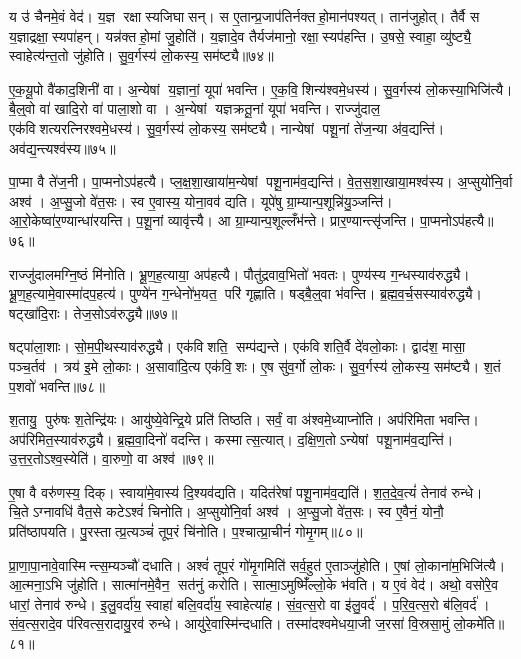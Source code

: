 य उ॑ चैनमे॒वं वेद॑।
य॒ज्ञ रक्षास्यजिघासन्।
स ए॒तान्प्र॒जाप॑तिर्नक्तहो॒मान॑पश्यत्।
तान॑जुहोत्।
तैर्वै स य॒ज्ञाद्रक्षा॒स्यपा॑हन्।
यन्न॑क्तहो॒मां जु॒होति॑।
य॒ज्ञादे॒व तैर्यज॑मानो॒ रक्षा॒स्यप॑हन्ति।
उ॒षसे॒ स्वाहा॒ व्यु॑ष्ट्यै॒ स्वाहेत्य॑न्त॒तो जु॑होति।
सु॒व॒र्गस्य॑ लो॒कस्य॒ सम॑ष्ट्यै॥७४॥\anuvakamend[वै नभासि॒ सूर्यो॒ ज्योति॒ सन्त॑त्यै॒ सम॑ष्ट्यै भू॒तं यज॑ते॒ नव॑ च]

ए॒क॒यू॒पो वै॑काद॒शिनी॑ वा।
अ॒न्येषां य॒ज्ञानां॒ यूपा॑ भवन्ति।
ए॒क॒वि॒शिन्य॑श्वमे॒धस्य॑।
सु॒व॒र्गस्य॑ लो॒कस्या॒भिजि॑त्यै।
बै॒ल्॒वो वा॑ खादि॒रो वा॑ पाला॒शो वा।
अ॒न्येषां यज्ञक्रतू॒नां यूपा॑ भवन्ति।
राज्जु॑दाल॒ एक॑विशत्यरत्निरश्वमे॒धस्य॑।
सु॒व॒र्गस्य॑ लो॒कस्य॒ सम॑ष्ट्यै।
नान्येषां पशू॒नां ते॑ज॒न्या अ॑व॒द्यन्ति॑।
अव॑द्य॒न्त्यश्व॑स्य॥७५॥

पा॒प्मा वै ते॑ज॒नी।
पा॒प्मनोऽप॑हत्यै।
प्ल॒क्ष॒शा॒खाया॑म॒न्येषां पशू॒नाम॑व॒द्यन्ति॑।
वे॒त॒स॒शा॒खाया॒मश्व॑स्य।
अ॒प्सुयो॑नि॒र्वा अश्व॑।
अ॒प्सु॒जो वे॑त॒सः।
स्व ए॒वास्य॒ योना॒वव॑ द्यति।
यूपे॑षु ग्रा॒म्यान्प॒शून्नि॑यु॒ञ्जन्ति॑।
आ॒रो॒केष्वा॑र॒ण्यान्धा॑रयन्ति।
प॒शू॒नां व्यावृ॑त्त्यै।
आ ग्रा॒म्यान्प॒शूल्लँभ॑न्ते।
प्रार॒ण्यान्त्सृ॑जन्ति।
पा॒प्मनोऽप॑हत्यै॥७६॥\anuvakamend[अश्व॑स्य॒ व्यावृ॑त्त्यै॒ त्रीणि॑ च]

राज्जु॑दालमग्नि॒ष्ठं मि॑नोति।
भ्रू॒ण॒ह॒त्याया॒ अप॑हत्यै।
पौतु॑द्रवाव॒भितो॑ भवतः।
पुण्य॑स्य ग॒न्धस्याव॑रुद्ध्यै।
भ्रू॒ण॒ह॒त्यामे॒वास्मा॑दप॒हत्य॑।
पुण्ये॑न ग॒न्धेनो॑भ॒यत॒ परि॑ गृह्णाति।
षड्बै॒ल्॒वा भ॑वन्ति।
ब्र॒ह्म॒व॒र्च॒सस्याव॑रुद्ध्यै।
षट्खा॑दि॒राः।
तेज॒सोऽव॑रुद्ध्यै॥७७॥

षट्पा॑ला॒शाः।
सो॒म॒पी॒थस्याव॑रुद्ध्यै।
एक॑विशति॒ सम्प॑द्यन्ते।
एक॑विशति॒र्वै दे॑वलो॒काः।
द्वाद॑श॒ मासा॒ पञ्च॒र्तव॑।
त्रय॑ इ॒मे लो॒काः।
अ॒सावा॑दि॒त्य एक॑वि॒शः।
ए॒ष सु॑व॒र्गो लो॒कः।
सु॒व॒र्गस्य॑ लो॒कस्य॒ सम॑ष्ट्यै।
श॒तं प॒शवो॑ भवन्ति॥७८॥

श॒तायु॒ पुरु॑षः श॒तेन्द्रि॑यः।
आयु॑ष्ये॒वेन्द्रि॒ये प्रति॑ तिष्ठति।
सर्वं॒ वा अ॑श्वमे॒ध्याप्नो॑ति।
अप॑रिमिता भवन्ति।
अप॑रिमित॒स्याव॑रुद्ध्यै।
ब्र॒ह्म॒वा॒दिनो॑ वदन्ति।
कस्मात्स॒त्यात्।
द॒क्षि॒ण॒तोऽन्येषां पशू॒नाम॑व॒द्यन्ति॑।
उ॒त्त॒र॒तोऽश्व॒स्येति॑।
वा॒रुणो॒ वा अश्व॑॥७९॥

ए॒षा वै वरु॑णस्य॒ दिक्।
स्वाया॑मे॒वास्य॑ दि॒श्यव॑द्यति।
यदित॑रेषां पशू॒नाम॑व॒द्यति॑।
श॒त॒दे॒व॒त्यं॑ तेनाव॑ रुन्धे।
चि॒तेऽग्नावधि॑ वैत॒से कटेऽश्वं॑ चिनोति।
अ॒प्सुयो॑नि॒र्वा अश्व॑।
अ॒प्सु॒जो वे॑त॒सः।
स्व ए॒वैनं॒ योनौ॒ प्रति॑ष्ठापयति।
पु॒रस्तात्प्र॒त्यञ्चं॑ तूप॒रं चि॑नोति।
प॒श्चात्प्रा॒चीनं॑ गोमृ॒गम्॥८०॥

प्रा॒णा॒पा॒नावे॒वास्मिन्त्स॒म्यञ्चौ॑ दधाति।
अश्वं॑ तूप॒रं गो॑मृ॒गमिति॑ सर्व॒हुत॑ ए॒ताञ्जु॑होति।
ए॒षां लो॒काना॑म॒भिजि॑त्यै।
आ॒त्मना॒ऽभि जु॑होति।
सात्मा॑नमे॒वैन॒ सत॑नुं करोति।
सात्मा॒ऽमुष्मिँ॑ल्लो॒के भ॑वति।
य ए॒वं वेद॑।
अथो॒ वसो॑रे॒व धारां॒ तेनाव॑ रुन्धे।
इ॒लु॒वर्दा॑य॒ स्वाहा॑ बलि॒वर्दा॑य॒ स्वाहेत्या॑ह।
सं॒व॒त्स॒रो वा इ॑लु॒वर्द॑।
प॒रि॒व॒त्स॒रो ब॑लि॒वर्द॑।
सं॒व॒त्स॒रादे॒व प॑रिवत्स॒रादायु॒रव॑ रुन्धे।
आयु॑रे॒वास्मि॑न्दधाति।
तस्मा॑दश्वमेधया॒जी ज॒रसा॑ वि॒स्रसा॒मुं लो॒कमे॑ति॥८१॥\anuvakamend[तेज॒सोऽव॑रुद्ध्यै भव॒न्त्यश्वो॑ गोमृ॒गमि॑लु॒वर्द॑श्च॒त्वारि॑ च]

